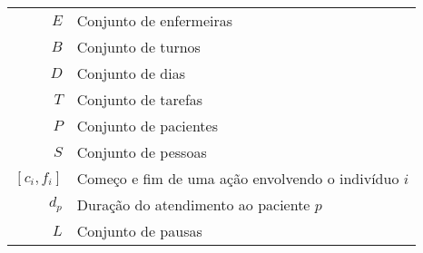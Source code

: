 
\begin{tabular}{rl}
$E$ & Conjunto de enfermeiras \\
$B$ & Conjunto de turnos \\
$D$ & Conjunto de dias \\
$T$ & Conjunto de tarefas \\
$P$ & Conjunto de pacientes \\
$S$ & Conjunto de pessoas \\
$[c_i,f_i]$ & Começo e fim de uma aç\~ ao envolvendo o indiv\'iduo $i$ \\
$d_p$ & Duraç\~ao do atendimento ao paciente $p$ \\
$L$ & Conjunto de pausas
\end{tabular}